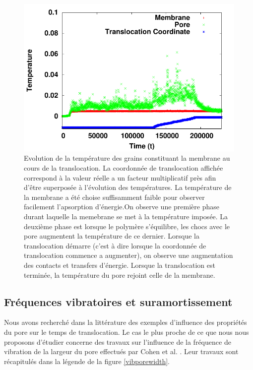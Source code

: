 \begin{figure}[H]
\begin{center}
\includegraphics[width=\textwidth]{temptransloc.pdf} 

\caption[Absorption d'énergie par la membrane]{Evolution de la température des grains constituant la membrane au cours de la translocation. La coordonnée de translocation affichée correspond à la valeur réelle a un facteur multiplicatif près afin d'être superposée à l'évolution des températures. La température de la membrane a été choise suffisamment faible pour observer facilement l'apsorption d'énergie.On observe une première phase durant laquelle la memebrane se met à la température imposée. La deuxième phase est lorsque le polymère s'équilibre, les chocs avec le pore augmentent la température de ce dernier. Lorsque la translocation démarre (c'est à dire lorsque la coordonnée de translocation commence a augmenter), on observe une augmentation des contacts et transfers d'énergie. Lorsque la translocation est terminée, la température du pore rejoint celle de la membrane.}
\label{temptransloc}
\end{center}
\end{figure}


\newpage
\subsection{Fréquences vibratoires et suramortissement}

Nous avons recherché dans la littérature des exemples d'influence des propriétés du pore sur le temps de translocation. Le cas le plus proche de ce que nous nous proposons d'étudier concerne des travaux sur l'influence de la fréquence de vibration de la largeur du pore effectués par Cohen et al. \cite{Cohen2011}. Leur travaux sont récapitulés dans la légende de la figure \ref{vibporewidth}.



